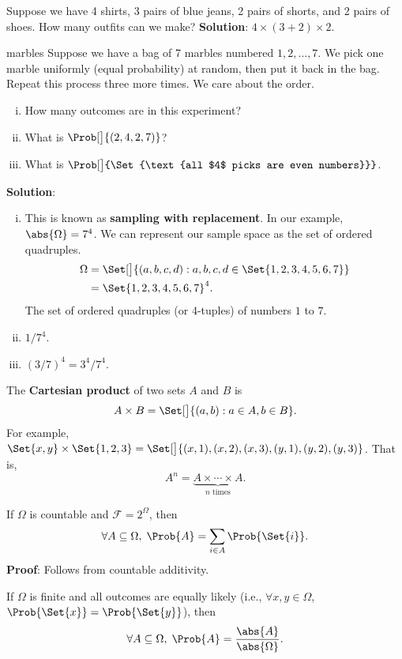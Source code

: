 \begin{Example}{}{}
    Suppose we have 4 shirts, 3 pairs of blue jeans, 2 pairs of shorts,
    and 2 pairs of shoes. How many outfits can we make?
    \tcblower{}
    \textbf{Solution}: $ 4\times (3+2)\times 2 $.
\end{Example}
\begin{Example}{}{marbles}
    Suppose we have a bag of 7 marbles numbered $ 1,2,\ldots,7 $.
    We pick one marble uniformly (equal probability) at random, then put it back in the bag.
    Repeat this process three more times. We care about the order.
    \begin{enumerate}[i.]
        \item How many outcomes are in this experiment?
        \item What is $ \Prob[\big]{(2,4,2,7)} $?
        \item What is $ \Prob[\big]{\Set{\text{all $4$ picks are even numbers}}} $.
    \end{enumerate}
    \tcblower{}
    \textbf{Solution}:
    \begin{enumerate}[i.]
        \item This is known as \textbf{sampling with replacement}.
              In our example, $ \abs{\Omega}=7^4 $. We can represent
              our sample space as the set of ordered quadruples.
              \begin{align*}
                  \Omega
                   & =\Set[\big]{(a,b,c,d)\given a,b,c,d\in\Set{1,2,3,4,5,6,7}} \\
                   & =\Set{1,2,3,4,5,6,7}^4.
              \end{align*}
              The set of ordered quadruples (or 4-tuples) of
              numbers $ 1 $ to $ 7 $.
        \item $ 1/7^4 $.
        \item $ (3/7)^4=3^4/7^4 $.
    \end{enumerate}
\end{Example}
\begin{Definition}{}{}
    The \textbf{Cartesian product} of two sets $ A $ and $ B $
    is
    \[ A\times B=\Set[\big]{(a,b)\given a\in A,b\in B}. \]
    \tcblower{}
    For example,
    $ \Set{x,y}\times \Set{1,2,3}=\Set[\big]{(x,1),(x,2),(x,3),(y,1),(y,2),(y,3)} $.
    That is,
    \[ A^n=\underbrace{A\times \cdots \times A}_{\text{$n$ times}}. \]
\end{Definition}
\begin{Proposition}{}{}
    If $ \Omega $ is countable and $ \mathcal{F}=2^{\Omega} $, then
    \[ \forall A\subseteq \Omega,\; \Prob{A}=\sum_{i\in A}\Prob{\Set{i}}. \]
    \tcblower{}
    \textbf{Proof}: Follows from countable additivity.
\end{Proposition}
\begin{Proposition}{}{}
    If $ \Omega $ is finite and all outcomes are equally likely
    (i.e., $ \forall x,y\in \Omega $, $ \Prob{\Set{x}}=\Prob{\Set{y}} $), then
    \[ \forall A\subseteq \Omega,\; \Prob{A}=\frac{\abs{A}}{\abs{\Omega}}. \]
\end{Proposition}
